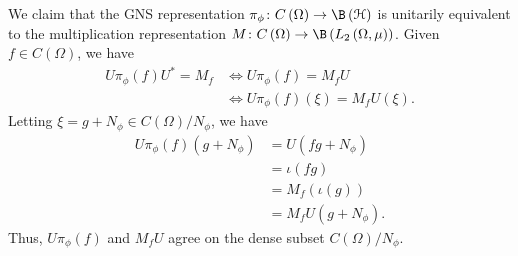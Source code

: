 \documentclass[10pt]{mypackage}
\begin{document}
\begin{example}
  We claim that the GNS representation $\pi_{\phi}\colon C\left(\Omega\right)\rightarrow \B\left(\mathcal{H}\right)$ is unitarily equivalent to the multiplication representation $M\colon C\left(\Omega\right)\rightarrow \B\left(L_2\left(\Omega,\mu\right)\right)$. Given $f\in C\left(\Omega\right)$, we have
  \begin{align*}
    U\pi_{\phi}\left(f\right)U^{\ast} = M_f &\Leftrightarrow U\pi_{\phi}\left(f\right) = M_fU\\
                                            &\Leftrightarrow U\pi_{\phi}\left(f\right)\left(\xi\right) = M_fU\left(\xi\right).
  \end{align*}
  Letting $\xi = g + N_{\phi}\in C\left(\Omega\right)/N_{\phi}$, we have
  \begin{align*}
    U\pi_{\phi}\left(f\right)\left(g + N_{\phi}\right) &= U\left(fg + N_{\phi}\right)\\
                                                       &= \iota\left(fg\right)\\
                                                       &= M_f\left(\iota\left(g\right)\right)\\
                                                       &= M_fU\left(g + N_{\phi}\right).
  \end{align*}
  Thus, $U\pi_{\phi}(f)$ and $M_fU$ agree on the dense subset $C\left(\Omega\right)/N_{\phi}$.
\end{example}
\end{document}
